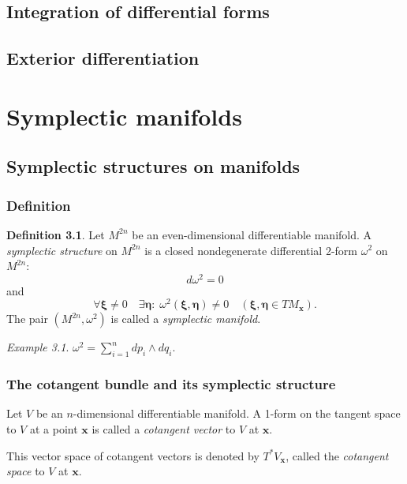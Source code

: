 \documentclass{book}
\numberwithin{equation}{section}
\theoremstyle{plain}
\theoremstyle{definition}
\newtheorem*{defn*}{Definition}
\theoremstyle{remark}
\theoremstyle{remark}
\newtheorem*{ex*}{Example}
\begin{document}
\section{Integration of differential forms}

\section{Exterior differentiation}


\chapter{Symplectic manifolds}

\section{Symplectic structures on manifolds}

\subsection{Definition}



\begin{defn*}
Let $M^{2n}$ be an even-dimensional differentiable manifold.
A \emph{symplectic structure} on $M^{2n}$ is a closed nondegenerate differential 2-form
$\omega^2$ on $M^{2n}$:
$$
d\omega^2 = 0
$$
and
$$
\forall \pmb \xi \ne 0
\quad
\exists \pmb \eta:
\;
\omega^2(\pmb \xi, \pmb \eta) \ne 0
\quad
(\pmb \xi, \pmb \eta \in TM_{\mathbf x}).
$$
The pair $(M^{2n}, \omega^2)$ is called
a \emph{symplectic manifold}.
\end{defn*}

\begin{ex*}
$\omega^2 = \sum_{i = 1}^n dp_i \wedge dq_i$.
\end{ex*}


\subsection{The cotangent bundle and its symplectic structure}



Let $V$ be an $n$-dimensional differentiable manifold.
%
A 1-form on the tangent space to $V$ at a point $\mathbf x$ is called
a \emph{cotangent vector} to $V$ at $\mathbf x$.

This vector space of cotangent vectors is denoted by $T^*V_{\mathbf x}$,
called the \emph{cotangent space} to $V$ at $\mathbf x$.
\end{document}
